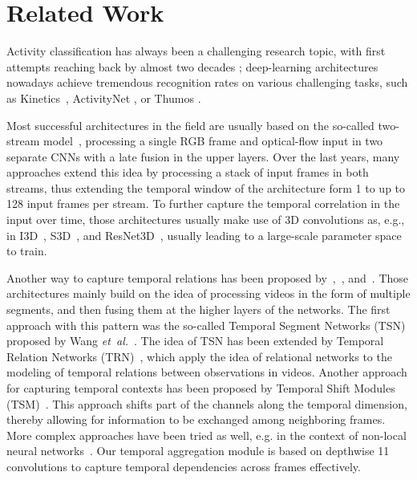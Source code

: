 \documentclass{article}
\def\etal{\textit{et~al.}\xspace}
\begin{document}
 \section{Related Work}

Activity classification has always been a challenging research topic, with first attempts reaching back by almost two decades \cite{Aggarwal2011Review}; deep-learning architectures nowadays achieve tremendous recognition rates on various challenging tasks, such as Kinetics~\cite{I3D:carreira2017quo}, ActivityNet \cite{caba2015activitynet}, or Thumos \cite{THUMOS14}.

Most successful architectures in the field are usually based on the so-called two-stream model~\cite{Simonyan14TwoStream}, processing a single RGB frame and optical-flow input in two separate CNNs with a late fusion in the upper layers. Over the last years, many approaches extend this idea by processing a stack of input frames in both streams, thus extending the temporal window of the architecture form 1 to up to 128 input frames per stream. To further capture the temporal correlation in the input over time, those architectures usually make use of 3D convolutions as, e.g., in  I3D~\cite{I3D:carreira2017quo}, S3D~\cite{S3D:xie2018rethinking}, and ResNet3D~\cite{ResNet3D:hara2017learning}, usually leading to a large-scale parameter space to train.

Another way to capture temporal relations has been proposed by~\cite{TSN:wang2016temporal},~\cite{TRN:zhou2018temporal}, and~\cite{TSM:lin2018temporal}. Those architectures mainly build on the idea of processing videos in the form of multiple segments, and then fusing them at the higher layers of the networks. 
The first approach with this pattern was the so-called Temporal Segment Networks (TSN) proposed by Wang \etal~\cite{TSN:wang2016temporal}. The idea of TSN has been extended by Temporal Relation Networks (TRN)~\cite{TRN:zhou2018temporal}, which apply the idea of relational networks to the modeling of temporal relations between observations in videos. 
Another approach for capturing temporal contexts has been proposed by Temporal Shift Modules (TSM)~\cite{TSM:lin2018temporal}. 
This approach shifts part of the channels along the temporal dimension, thereby allowing for information to be exchanged among neighboring frames. 
More complex approaches have been tried as well, e.g. in the context of non-local neural networks~\cite{Wang2018NonLocal}. 
Our temporal aggregation module is based on depthwise 11 convolutions to capture temporal dependencies across frames effectively.
\end{document}
